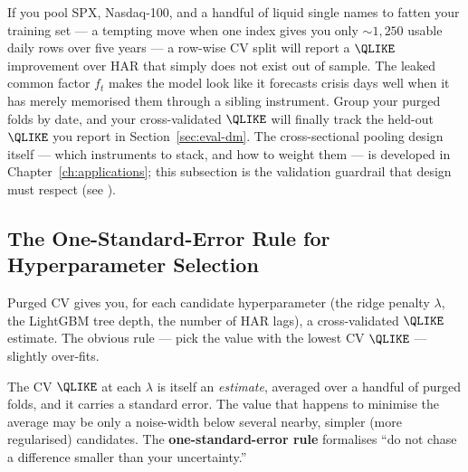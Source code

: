 \begin{projectconnection}
If you pool SPX, Nasdaq-100, and a handful of liquid single names to fatten your training set --- a tempting move when one index gives you only ${\sim}1{,}250$ usable daily rows over five years --- a row-wise CV split will report a $\QLIKE$ improvement over HAR that simply does not exist out of sample.
The leaked common factor $f_t$ makes the model look like it forecasts crisis days well when it has merely memorised them through a sibling instrument.
Group your purged folds by date, and your cross-validated $\QLIKE$ will finally track the held-out $\QLIKE$ you report in Section~\ref{sec:eval-dm}.
The cross-sectional pooling design itself --- which instruments to stack, and how to weight them --- is developed in Chapter~\ref{ch:applications}; this subsection is the validation guardrail that design must respect (see ).
\end{projectconnection}


\subsection{The One-Standard-Error Rule for Hyperparameter Selection}
\label{sec:eval-one-se}

Purged CV gives you, for each candidate hyperparameter (the ridge penalty $\lambda$, the LightGBM tree depth, the number of HAR lags), a cross-validated $\QLIKE$ estimate.
The obvious rule --- pick the value with the lowest CV $\QLIKE$ --- slightly over-fits.

The CV $\QLIKE$ at each $\lambda$ is itself an \emph{estimate}, averaged over a handful of purged folds, and it carries a standard error.
The value that happens to minimise the average may be only a noise-width below several nearby, simpler (more regularised) candidates.
The \textbf{one-standard-error rule} formalises ``do not chase a difference smaller than your uncertainty.''

